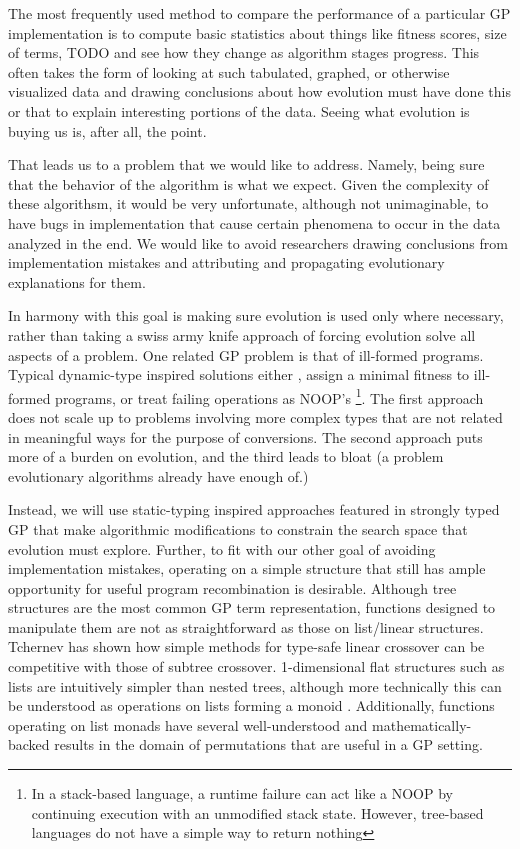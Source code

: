 \documentclass{acm_proc_article-sp}
\begin{document}
The most frequently used method to compare the performance of a
particular GP implementation is to compute basic statistics about
things like fitness scores, size of terms, TODO and see how they
change as algorithm stages progress. This often takes the form of
looking at such tabulated, graphed, or otherwise visualized data and
drawing conclusions about how evolution must have done this or that to
explain interesting portions of the data. Seeing what evolution is
buying us is, after all, the point.

That leads us to a problem that we would like to address. Namely,
being sure that the behavior of the algorithm is what we expect. Given
the complexity of these algorithsm, it would be very unfortunate,
although not unimaginable, to have bugs in implementation that cause
certain phenomena to occur in the data analyzed in the end. We would
like to avoid researchers drawing conclusions from implementation
mistakes and attributing and propagating evolutionary explanations for
them.

In harmony with this goal is making sure evolution is used only where
necessary, rather than taking a swiss army knife approach of forcing
evolution solve all aspects of a problem. One
related GP problem is that of ill-formed programs. Typical
dynamic-type inspired solutions either \cite{koza:onlygood}, assign a minimal fitness to
ill-formed programs, or treat failing operations as
NOOP's
\footnote{In a stack-based language, a runtime failure can act like a
  NOOP by continuing execution with an unmodified stack state. However,
  tree-based languages do not have a simple way to return nothing}.
The first approach does not scale up to problems involving more
complex types that are not related in meaningful ways for the purpose
of conversions. The second approach puts more of a burden on evolution, and the third
leads to bloat (a problem evolutionary algorithms already have enough
of.)

Instead, we will use static-typing inspired approaches featured in
strongly typed GP \cite{montana:strongtree, tchernev:forthcross} that make algorithmic
modifications to constrain the search space that evolution must
explore. Further, to fit with our other goal of avoiding
implementation mistakes, operating on a simple structure that still
has ample opportunity for useful program recombination is
desirable. Although tree structures are the most common GP term
representation, functions designed to manipulate them are not as
straightforward as those on list/linear structures. Tchernev
\cite{tchernev:forthcross, tchernev:crossmethods} has shown how simple
methods for type-safe linear crossover can be competitive with those
of subtree crossover. 1-dimensional flat structures such as lists are
intuitively simpler than nested trees, although more technically this
can be understood as operations on lists forming a monoid
\cite{to:do}. Additionally, functions operating on list monads have
several well-understood and mathematically-backed results in the
domain of permutations that are useful in a GP setting.
\end{document}
